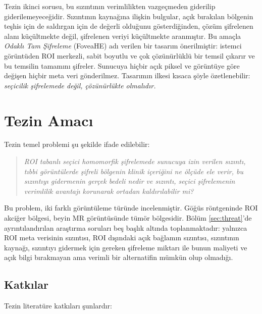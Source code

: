 Tezin ikinci sorusu, bu sızıntının verimlilikten vazgeçmeden giderilip giderilemeyeceğidir. Sızıntının kaynağına ilişkin bulgular, açık bırakılan bölgenin teşhis için de saldırgan için de değerli olduğunu gösterdiğinden, çözüm şifrelenen alanı küçültmekte değil, şifrelenen veriyi küçültmekte aranmıştır. Bu amaçla \emph{Odaklı Tam Şifreleme} (FoveaHE) adı verilen bir tasarım önerilmiştir: istemci görüntüden ROI merkezli, sabit boyutlu ve çok çözünürlüklü bir temsil çıkarır ve bu temsilin tamamını şifreler. Sunucuya hiçbir açık piksel ve görüntüye göre değişen hiçbir meta veri gönderilmez. Tasarımın ilkesi kısaca şöyle özetlenebilir: \emph{seçicilik şifrelemede değil, çözünürlükte olmalıdır.}

\section{Tezin Amacı}\label{tezinamaci}

Tezin temel problemi şu şekilde ifade edilebilir:

\begin{quote}
\emph{ROI tabanlı seçici homomorfik şifrelemede sunucuya izin verilen sızıntı, tıbbi görüntülerde şifreli bölgenin klinik içeriğini ne ölçüde ele verir, bu sızıntıyı gidermenin gerçek bedeli nedir ve sızıntı, seçici şifrelemenin verimlilik avantajı korunarak ortadan kaldırılabilir mi?}
\end{quote}

Bu problem, iki farklı görüntüleme türünde incelenmiştir. Göğüs röntgeninde ROI akciğer bölgesi, beyin MR görüntüsünde tümör bölgesidir. Bölüm \ref{sec:threat}'de ayrıntılandırılan araştırma soruları beş başlık altında toplanmaktadır: yalnızca ROI meta verisinin sızıntısı, ROI dışındaki açık bağlamın sızıntısı, sızıntının kaynağı, sızıntıyı gidermek için gereken şifreleme miktarı ile bunun maliyeti ve açık bilgi bırakmayan ama verimli bir alternatifin mümkün olup olmadığı.

\subsection{Katkılar}\label{katkilar}

Tezin literatüre katkıları şunlardır:

